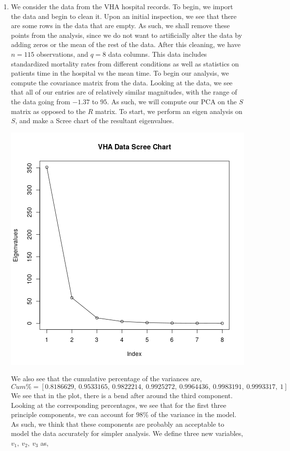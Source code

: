 \documentclass[letterpaper,10pt]{article}
\begin{document}
\begin{enumerate}
\item We consider the data from the VHA hospital records. To begin, we import the data and begin to clean it. Upon an initial inspection, we see that there are some rows in the data that are empty. As such, we shall remove these points from the analysis, since we do not want to artificially alter the data by adding zeros or the mean of the rest of the data. After this cleaning, we have $n=115$ observations, and $q=8$ data columns. This data includes standardized mortality rates from different conditions as well as statistics on patients time in the hospital vs the mean time. To begin our analysis, we compute the covariance matrix from the data. Looking at the data, we see that all of our entries are of relatively similar magnitudes, with the range of the data going from $-1.37$ to $95$. As such, we will compute our PCA on the $S$ matrix as opposed to the $R$ matrix. To start, we perform an eigen analysis on $S$, and make a Scree chart of the resultant eigenvalues.
\begin{center}
\includegraphics[scale=.5]{VHAscree.png}
\end{center}
We also see that the cumulative percentage of the variances are,
\[Cum\%=[0.8186629,\ 0.9533165,\ 0.9822214,\ 0.9925272,\ 0.9964436,\ 0.9983191,\ 0.9993317,\ 1]\]
We see that in the plot, there is a bend after around the third component. Looking at the corresponding percentages, we see that for the first three principle components, we can account for $98\%$ of the variance in the model. As such, we think that these components are probably an acceptable to model the data accurately for simpler analysis. We define three new variables, $v_1,\ v_2,\ v_3$ as,

\end{enumerate}
\end{document}
